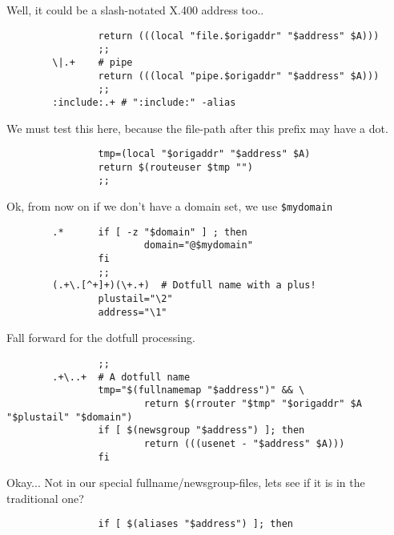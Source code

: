 Well, it could be a slash-notated X.400 address too..

\begin{tscreen}
\begin{verbatim}
                return (((local "file.$origaddr" "$address" $A)))
                ;;
        \|.+    # pipe
                return (((local "pipe.$origaddr" "$address" $A)))
                ;;
        :include:.+ # ":include:" -alias
\end{verbatim}
\end{tscreen}


We must test this here, because the file-path after
this prefix may have a dot.

\begin{tscreen}
\begin{verbatim}
                tmp=(local "$origaddr" "$address" $A)
                return $(routeuser $tmp "")
                ;;
\end{verbatim}
\end{tscreen}


Ok, from now on if we don't have a domain set, we use {\tt \$mydomain}

\begin{tscreen}
\begin{verbatim}
        .*      if [ -z "$domain" ] ; then
                        domain="@$mydomain"
                fi
                ;;
        (.+\.[^+]+)(\+.+)  # Dotfull name with a plus!
                plustail="\2"
                address="\1"
\end{verbatim}
\end{tscreen}


Fall forward for the dotfull processing.

\begin{tscreen}
\begin{verbatim}
                ;;
        .+\..+  # A dotfull name
                tmp="$(fullnamemap "$address")" && \
                        return $(rrouter "$tmp" "$origaddr" $A "$plustail" "$domain")
                if [ $(newsgroup "$address") ]; then
                        return (((usenet - "$address" $A)))
                fi
\end{verbatim}
\end{tscreen}


Okay... Not in our special fullname/newsgroup-files,
lets see if it is in the traditional one?

\begin{tscreen}
\begin{verbatim}
                if [ $(aliases "$address") ]; then
\end{verbatim}
\end{tscreen}



